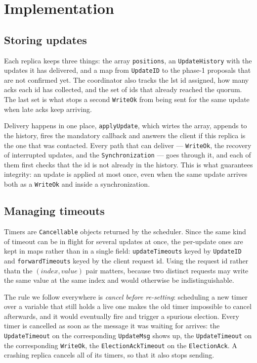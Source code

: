 \section{Implementation}

\subsection*{Storing updates}

Each replica keeps three things: the array \texttt{positions}, an \texttt{UpdateHistory} with the updates it has delivered, and a map from \texttt{UpdateID} to the phase-1 proposals that are not confirmed yet. The coordinator also tracks the lst id assigned, how many acks each id has collected, and the set of ids that already reached the quorum. The last set is what stops a second \texttt{WriteOk} from being sent for the same update when late acks keep arriving.

Delivery happens in one place, \texttt{applyUpdate}, which wirtes the array, appends to the history, fires the mandatory callback and answers the client if this replica is the one that was contacted. Every path that can deliver --- \texttt{WriteOk}, the recovery of interrupted updates, and the \texttt{Synchronization} --- goes through it, and each of them first checks that the id is not already in the history. This is what guarantees integrity: an update is applied at most once, even when the same update arrives both as a \texttt{WriteOk} and inside a synchronization.

\subsection*{Managing timeouts}

Timers are \texttt{Cancellable} objects returned by the scheduler. Since the same kind of timeout can be in flight for several updates at once, the per-update ones are kept in maps rather than in a single field: \texttt{updateTimeouts} keyed by \texttt{UpdateID} and \texttt{forwardTimeouts} keyed by the client request id. Using the request id rather thatn the $(index, value)$ pair matters, because two distinct requests may write the same value at the same index and would otherwise be indistinguishable.

The rule we follow everywhere is \emph{cancel before re-setting}: scheduling a new timer over a variable that still holds a live one makes the old timer impossible to cancel afterwards, and it would eventually fire and trigger a spurious election. Every timer is cancelled as soon as the message it was waiting for arrives: the \texttt{UpdateTimeout} on the corresponding \texttt{UpdateMsg} shows up, the \texttt{UpdateTimeout} on the corresponding \texttt{WriteOk}, the \texttt{ElectionAckTimeout} on the \texttt{ElectionAck}. A crashing replica cancels all of its timers, so that it also stops sending.

